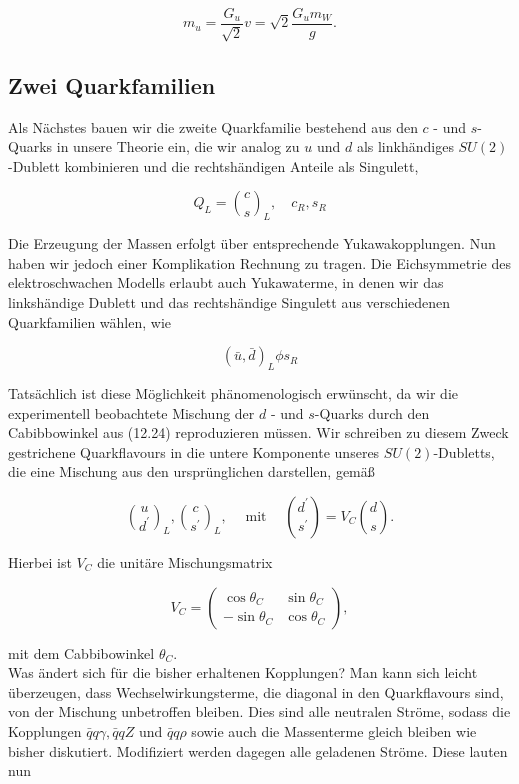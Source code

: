 \documentclass[10pt, letterpaper]{article}
\begin{document}
$$
m_{u}=\frac{G_{u}}{\sqrt{2}} v=\sqrt{2} \frac{G_{u} m_{W}}{g} .
$$

\subsection*{Zwei Quarkfamilien}
Als Nächstes bauen wir die zweite Quarkfamilie bestehend aus den $c$ - und $s$-Quarks in unsere Theorie ein, die wir analog zu $u$ und $d$ als linkhändiges $S U(2)$-Dublett kombinieren und die rechtshändigen Anteile als Singulett,

$$
Q_{L}=\binom{c}{s}_{L}, \quad c_{R}, s_{R}
$$

Die Erzeugung der Massen erfolgt über entsprechende Yukawakopplungen. Nun haben wir jedoch einer Komplikation Rechnung zu tragen. Die Eichsymmetrie des elektroschwachen Modells erlaubt auch Yukawaterme, in denen wir das linkshändige Dublett und das rechtshändige Singulett aus verschiedenen Quarkfamilien wählen, wie

$$
(\bar{u}, \bar{d})_{L} \phi s_{R}
$$

Tatsächlich ist diese Möglichkeit phänomenologisch erwünscht, da wir die experimentell beobachtete Mischung der $d$ - und $s$-Quarks durch den Cabibbowinkel aus (12.24) reproduzieren müssen. Wir schreiben zu diesem Zweck gestrichene Quarkflavours in die untere Komponente unseres $S U(2)$-Dubletts, die eine Mischung aus den ursprünglichen darstellen, gemäß

$$
\binom{u}{d^{\prime}}_{L},\binom{c}{s^{\prime}}_{L}, \quad \operatorname{mit} \quad\binom{d^{\prime}}{s^{\prime}}=V_{C}\binom{d}{s} .
$$

Hierbei ist $V_{C}$ die unitäre Mischungsmatrix

$$
V_{C}=\left(\begin{array}{cc}
\cos \theta_{C} & \sin \theta_{C} \\
-\sin \theta_{C} & \cos \theta_{C}
\end{array}\right),
$$

mit dem Cabbibowinkel $\theta_{C}$.\\
Was ändert sich für die bisher erhaltenen Kopplungen? Man kann sich leicht überzeugen, dass Wechselwirkungsterme, die diagonal in den Quarkflavours sind, von der Mischung unbetroffen bleiben. Dies sind alle neutralen Ströme, sodass die Kopplungen $\bar{q} q \gamma, \bar{q} q Z$ und $\bar{q} q \rho$ sowie auch die Massenterme gleich bleiben wie\\
bisher diskutiert. Modifiziert werden dagegen alle geladenen Ströme. Diese lauten nun
\end{document}
